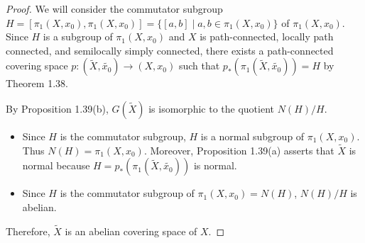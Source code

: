 \documentclass[12pt, psamsfonts]{amsart}
\theoremstyle{definition}
\theoremstyle{remark}
\numberwithin{equation}{section}
\begin{document}
\begin{proof}
  We will consider the commutator subgroup $H = [\pi_1(X, x_0), \pi_1(X, x_0)] = \{ [a, b] \mid a, b \in \pi_1(X, x_0) \}$ of $\pi_1(X, x_0)$.
  Since $H$ is a subgroup of $\pi_1(X, x_0)$ and $X$ is path-connected, locally path connected, and semilocally simply connected, there exists a path-connected covering space $p: (\tilde{X}, \tilde{x_0}) \rightarrow (X, x_0)$ such that $p_*(\pi_1(\tilde{X}, \tilde{x_0})) = H$ by Theorem 1.38.

  By Proposition 1.39(b), $G(\tilde{X})$ is isomorphic to the quotient $N(H) / H$.
  \begin{itemize}
    \item
      Since $H$ is the commutator subgroup, $H$ is a normal subgroup of $\pi_1(X, x_0)$.
      Thus $N(H) = \pi_1(X, x_0)$.
      Moreover, Proposition 1.39(a) asserts that $\tilde{X}$ is normal because $H = p_*(\pi_1(\tilde{X}, \tilde{x_0}))$ is normal.
    \item
      Since $H$ is the commutator subgroup of $\pi_1(X, x_0) = N(H)$, $N(H) / H$ is abelian.
  \end{itemize}
  Therefore, $\tilde{X}$ is an abelian covering space of $X$.



  



\end{proof}
\end{document}

